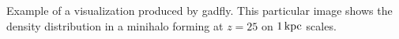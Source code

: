 Example of a visualization produced by gadfly.  This particular image shows the density distribution in a minihalo forming at $z=25$ on $1\,{\rm kpc}$ scales.